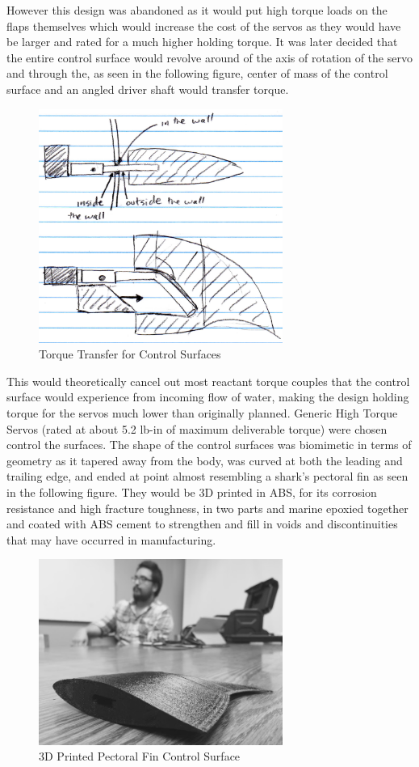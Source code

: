 \documentclass{report}
\begin{document}
However this design was abandoned as it would put high torque loads on the flaps themselves which would increase the cost of the servos as they would have be larger and  rated for a much higher holding torque. It was later decided that the entire control surface would revolve around of the axis of rotation of the servo and through the, as seen in the following figure, center of mass of the control surface and an angled driver shaft would transfer torque. 
\begin{figure}[H]
\centering
\includegraphics[width=8cm]{ttcs}
\caption{Torque Transfer for Control Surfaces}
\end{figure}
This would theoretically cancel out most reactant torque couples that the control surface would experience from incoming flow of water, making the design holding torque for the servos much lower than originally planned. Generic High Torque Servos (rated at about 5.2 lb-in of maximum deliverable torque) were chosen control the surfaces. The shape of the control surfaces was biomimetic in terms of geometry as it tapered away from the body, was curved at both the leading and trailing edge, and ended at point almost resembling a shark’s pectoral fin as seen in the following figure. They would be 3D printed in ABS, for its corrosion resistance and high fracture toughness, in two parts and marine epoxied together and coated with ABS cement to strengthen and fill in voids and discontinuities that may have occurred in manufacturing.
\begin{figure}[H]
\centering
\includegraphics[width=8cm]{csbw}
\caption{3D Printed Pectoral Fin Control Surface}
\end{figure}
\end{document}
